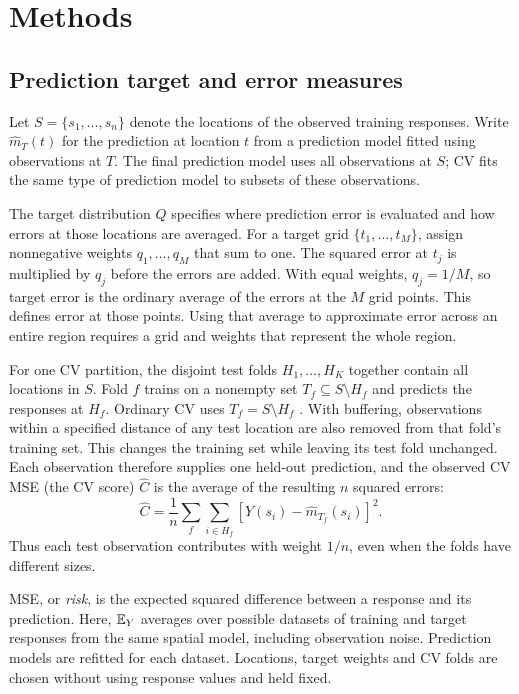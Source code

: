 \section{Methods}
\label{sec:methods}
\subsection{Prediction target and error measures}
Let $S=\{s_1,\ldots,s_n\}$ denote the locations of the observed training responses. Write $\widehat m_T(t)$ for the prediction at location $t$ from a prediction model fitted using observations at $T$. The final prediction model uses all observations at $S$; CV fits the same type of prediction model to subsets of these observations.

The target distribution $Q$ specifies where prediction error is evaluated and how errors at those locations are averaged. For a target grid $\{t_1,\ldots,t_M\}$, assign nonnegative weights $q_1,\ldots,q_M$ that sum to one. The squared error at $t_j$ is multiplied by $q_j$ before the errors are added. With equal weights, $q_j=1/M$, so target error is the ordinary average of the errors at the $M$ grid points. This defines error at those points. Using that average to approximate error across an entire region requires a grid and weights that represent the whole region.

For one CV partition, the disjoint test folds $H_1,\ldots,H_K$ together contain all locations in $S$. Fold $f$ trains on a nonempty set $T_f\subseteq S\setminus H_f$ and predicts the responses at $H_f$. Ordinary CV uses $T_f=S\setminus H_f$ \citep{arlot2010survey}. With buffering, observations within a specified distance of any test location are also removed from that fold's training set. This changes the training set while leaving its test fold unchanged. Each observation therefore supplies one held-out prediction, and the observed CV MSE (the CV score) $\widehat C$ is the average of the resulting $n$ squared errors:
\[
 \widehat C=\frac{1}{n}\sum_f\sum_{i\in H_f}[Y(s_i)-\widehat m_{T_f}(s_i)]^2.
\]
Thus each test observation contributes with weight $1/n$, even when the folds have different sizes.

MSE, or \emph{risk}, is the expected squared difference between a response and its prediction. Here, $\mathbb{E}_Y$ averages over possible datasets of training and target responses from the same spatial model, including observation noise. Prediction models are refitted for each dataset. Locations, target weights and CV folds are chosen without using response values and held fixed.

